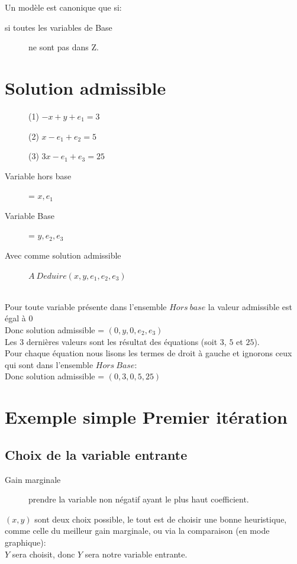 Un modèle est canonique que si:
\begin{description}
\item[si toutes les variables de Base] ne sont pas dans Z.
\end{description}

\section{Solution admissible}
\begin{description}
\item[] (1) $-x + y + e_1 = 3$
\item[] (2) $x - e_1 + e_2 = 5$
\item[] (3) $3x - e_1 + e_3 = 25$
\item[Variable hors base] = $x,e_1$
\item[Variable Base] = $y,e_2,e_3$
\item[Avec comme solution admissible] $A\ Deduire (x,y,e_1,e_2,e_3)$
\end{description}
\ \\
Pour toute variable présente dans l'ensemble $Hors\ base$ la valeur admissible est égal à $0$\\
Donc solution admissible = $(0, y, 0, e_2, e_3)$\\
Les 3 dernières valeurs sont les résultat des équations (soit $3$, $5$ et $25$).\\
Pour chaque équation nous lisons les termes de droit à gauche et ignorons ceux qui sont dans l'ensemble $Hors\ Base$:\\
Donc solution admissible = $(0, 3, 0, 5, 25)$\\

\section{Exemple simple Premier itération}
\subsection{Choix de la variable entrante}
\begin{description}
\item[Gain marginale] prendre la variable non négatif ayant le plus haut coefficient.
\end{description}
$(x,y)$ sont deux choix possible, le tout est de choisir une bonne heuristique, comme celle du meilleur gain marginale, ou via la comparaison (en mode graphique):\\
$Y$ sera choisit, donc $Y$ sera notre variable entrante.\\

